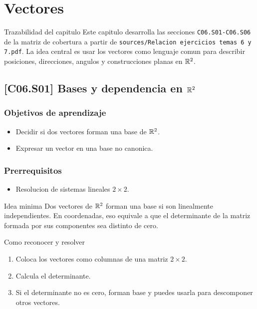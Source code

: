 \chapter{Vectores}

\begin{theorybox}{Trazabilidad del capitulo}
Este capitulo desarrolla las secciones \texttt{C06.S01-C06.S06} de la matriz de cobertura a
partir de \texttt{sources/Relacion ejercicios temas 6 y 7.pdf}. La idea central es usar los
vectores como lenguaje comun para describir posiciones, direcciones, angulos y construcciones
planas en \(\mathbb{R}^2\).
\end{theorybox}

\section{[C06.S01] Bases y dependencia en \texorpdfstring{\(\mathbb{R}^2\)}{R2}}

\subsection*{Objetivos de aprendizaje}
\begin{itemize}
  \item Decidir si dos vectores forman una base de \(\mathbb{R}^2\).
  \item Expresar un vector en una base no canonica.
\end{itemize}

\subsection*{Prerrequisitos}
\begin{itemize}
  \item Resolucion de sistemas lineales \(2\times 2\).
\end{itemize}

\begin{theorybox}{Idea minima}
Dos vectores de \(\mathbb{R}^2\) forman una base si son linealmente independientes. En coordenadas, eso
equivale a que el determinante de la matriz formada por sus componentes sea distinto de cero.
\end{theorybox}

\begin{methodbox}{Como reconocer y resolver}
\begin{enumerate}
  \item Coloca los vectores como columnas de una matriz \(2\times 2\).
  \item Calcula el determinante.
  \item Si el determinante no es cero, forman base y puedes usarla para descomponer otros vectores.
\end{enumerate}
\end{methodbox}

